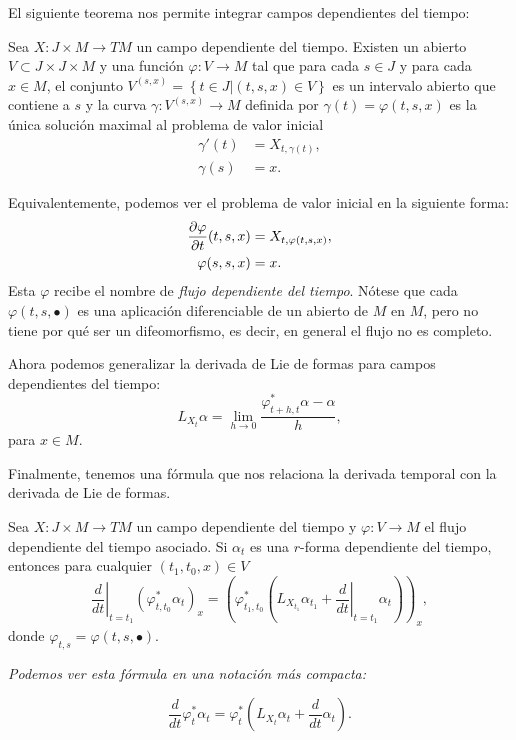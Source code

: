   El siguiente teorema nos permite integrar campos dependientes del tiempo:
  \begin{thm}
    Sea $X:J\times M \rightarrow TM$ un campo dependiente del tiempo. Existen un abierto $V\subset J\times J\times M$ y una función $\varphi:V\rightarrow M$ tal que para cada $s\in J$ y para cada $x\in M$, el conjunto $V^{(s,x)}=\left\{ t\in J | (t,s,x) \in V \right\}$ es un intervalo abierto que contiene a $s$ y la curva $\gamma:V^{(s,x)}\rightarrow M$ definida por $\gamma(t)=\varphi(t,s,x)$ es la única solución maximal al problema de valor inicial
    \begin{align*}
      \gamma'(t)&=X_{t,\gamma(t)}, \\
      \gamma(s)&=x.
    \end{align*}
  \end{thm}
    Equivalentemente, podemos ver el problema de valor inicial en la siguiente forma:
    \begin{align*}
      \frac{\partial \varphi}{\partial t}(t,s,x)&=X_{t,\varphi(t,s,x)}, \\
      \varphi(s,s,x)&=x.
    \end{align*}
    Esta $\varphi$ recibe el nombre de \emph{flujo dependiente del tiempo}. Nótese que cada $\varphi(t,s,\bullet)$ es una aplicación diferenciable de un abierto de $M$ en $M$, pero no tiene por qué ser un difeomorfismo, es decir, en general el flujo no es completo.

  Ahora podemos generalizar la derivada de Lie de formas para campos dependientes del tiempo:
  \begin{equation*}
    L_{X_{t}}\alpha=\lim_{h\rightarrow 0}\frac{\varphi^*_{t+h,t} \alpha - \alpha}{h},
  \end{equation*}
  para $x\in M$.
  
  Finalmente, tenemos una fórmula que nos relaciona la derivada temporal con la derivada de Lie de formas.
  \begin{prop}
    Sea $ X:J\times M \rightarrow TM $ un campo dependiente del tiempo y $ \varphi:V\rightarrow M $ el flujo dependiente del tiempo asociado. Si $\alpha_t$ es una $r$-forma dependiente del tiempo, entonces para cualquier $(t_1,t_0,x)\in V$ 
   \begin{equation*}
     \left.\frac{d}{dt}\right\lvert _{t=t_1}\left(\varphi^*_{t,t_0} \alpha_t\right)_x = \left(\varphi^*_{t_1,t_0} \left( L_{X_{t_1}}\alpha_{t_1} + \left.\frac{d}{dt}\right\lvert_{t=t_1}\alpha_t\right) \right)_x,
   \end{equation*}
   donde $\varphi_{t,s}=\varphi(t,s,\bullet)$. 
\end{prop}
\begin{obs}
  \em
   Podemos ver esta fórmula en una notación más compacta:

    \begin{equation*}
      \frac{d}{dt}\varphi^*_t \alpha_t = \varphi^*_t \left( L_{X_t}\alpha_t + \frac{d}{dt}\alpha_t \right).
    \end{equation*}
  \end{obs}

